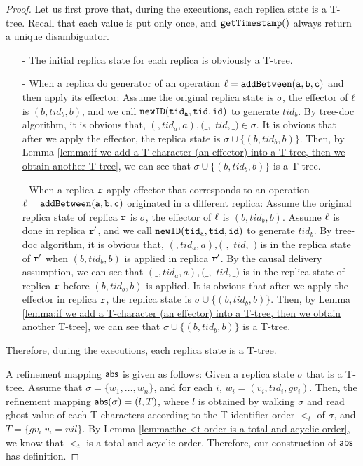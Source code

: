 \begin {proof}

Let us first prove that, during the executions, each replica state is a T-tree. Recall that each value is put only once, and $\alabelshort[{\tt getTimestamp}]{}$ always return a unique disambiguator.

\begin{itemize}
\setlength{\itemsep}{0.5pt}
\item[-] The initial replica state for each replica is obviously a T-tree.

\item[-] When a replica do generator of an operation $\alabel = \alabelshort[{\tt addBetween}]{a,b,c}$ and then apply its effector: Assume the original replica state is $\sigma$, the effector of $\alabel$ is $(b,tid_b,b)$, and we call $\alabelshort[{\tt newID}]{tid_a,tid,id}$ to generate $tid_b$. By tree-doc algorithm, it is obvious that, $(,tid_a,a),(\_,$ $tid,\_) \in \sigma$. It is obvious that after we apply the effector, the replica state is $\sigma \cup \{ (b,tid_b,b) \}$. Then, by Lemma \ref{lemma:if we add a T-character (an effector) into a T-tree, then we obtain another T-tree}, we can see that $\sigma \cup \{ (b,tid_b,b) \}$ is a T-tree.

\item[-] When a replica $\arep$ apply effector that corresponds to an operation $\alabel = \alabelshort[{\tt addBetween}]{a,b,c}$ originated in a different replica: Assume the original replica state of replica $\arep$ is $\sigma$, the effector of $\alabel$ is $(b,tid_b,b)$. Assume $\alabel$ is done in replica $\arep'$, and we call $\alabelshort[{\tt newID}]{tid_a,tid,id}$ to generate $tid_b$. By tree-doc algorithm, it is obvious that, $(,tid_a,a),(\_,$ $tid,\_)$ is in the replica state of $\arep'$ when $(b,tid_b,b)$ is applied in replica $\arep'$. By the causal delivery assumption, we can see that $(\_,tid_a,a),(\_,$ $tid,\_)$ is in the replica state of replica $\arep$ before $(b,tid_b,b)$ is applied. It is obvious that after we apply the effector in replica $\arep$, the replica state is $\sigma \cup \{ (b,tid_b,b) \}$. Then, by Lemma \ref{lemma:if we add a T-character (an effector) into a T-tree, then we obtain another T-tree}, we can see that $\sigma \cup \{ (b,tid_b,b) \}$ is a T-tree.
\end{itemize}

Therefore, during the executions, each replica state is a T-tree.

A refinement mapping $\refmap$ is given as follows: Given a replica state $\sigma$ that is a T-tree. Assume that $\sigma = \{ w_1,\ldots,w_n\}$, and for each $i$, $w_i = (v_i,tid_i,gv_i)$. Then, the refinement mapping $\refmap(\sigma) = (l,T)$, where $l$ is obtained by walking $\sigma$ and read ghost value of each T-characters according to the T-identifier order $<_t$ of $\sigma$, and $T = \{ gv_i \vert v_i = nil \}$. By Lemma \ref{lemma:the <t order is a total and acyclic order}, we know that $<_t$ is a total and acyclic order. Therefore, our construction of $\refmap$ has definition.


\end{proof}
